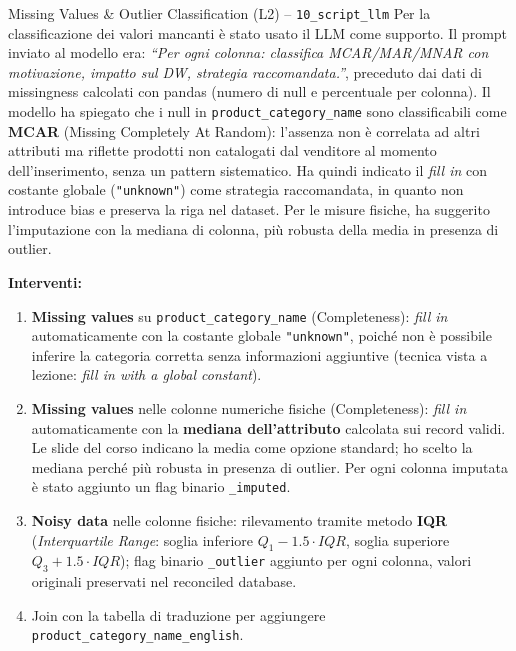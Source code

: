 \documentclass[12pt,a4paper]{article}
\begin{document}
\begin{aibox}{Missing Values \& Outlier Classification (L2) -- \texttt{10\_script\_llm}}
Per la classificazione dei valori mancanti è stato usato il LLM come supporto.
Il prompt inviato al modello era: \textit{``Per ogni colonna: classifica
MCAR/MAR/MNAR con motivazione, impatto sul DW, strategia raccomandata.''},
preceduto dai dati di missingness calcolati con pandas (numero di null e
percentuale per colonna).
Il modello ha spiegato che i null in \texttt{product\_category\_name} sono
classificabili come \textbf{MCAR} (Missing Completely At Random): l'assenza
non è correlata ad altri attributi ma riflette prodotti non catalogati dal
venditore al momento dell'inserimento, senza un pattern sistematico. Ha quindi
indicato il \textit{fill in} con costante globale (\texttt{"unknown"}) come
strategia raccomandata, in quanto non introduce bias e preserva la riga nel
dataset. Per le misure fisiche, ha suggerito l'imputazione con la mediana di
colonna, più robusta della media in presenza di outlier.
\end{aibox}

\textbf{Interventi:}
\begin{enumerate}
  \item \textbf{Missing values} su \texttt{product\_category\_name}
        (Completeness): \textit{fill in} automaticamente con la costante globale
        \texttt{"unknown"}, poiché non è possibile inferire la categoria corretta
        senza informazioni aggiuntive (tecnica vista a lezione:
        \textit{fill in with a global constant}).

  \item \textbf{Missing values} nelle colonne numeriche fisiche (Completeness):
        \textit{fill in} automaticamente con la \textbf{mediana dell'attributo}
        calcolata sui record validi. Le slide del corso indicano la media come
        opzione standard; ho scelto la mediana perché più robusta in presenza di
        outlier. Per ogni colonna imputata è stato aggiunto un flag binario
        \texttt{\_imputed}.

  \item \textbf{Noisy data} nelle colonne fisiche: rilevamento tramite metodo
        \textbf{IQR} (\textit{Interquartile Range}: soglia inferiore $Q_1 - 1.5 \cdot IQR$,
        soglia superiore $Q_3 + 1.5 \cdot IQR$);
        flag binario \texttt{\_outlier} aggiunto per ogni colonna, valori originali
        preservati nel reconciled database.

  \item Join con la tabella di traduzione per aggiungere
        \texttt{product\_category\_name\_english}.
\end{enumerate}
\end{document}
